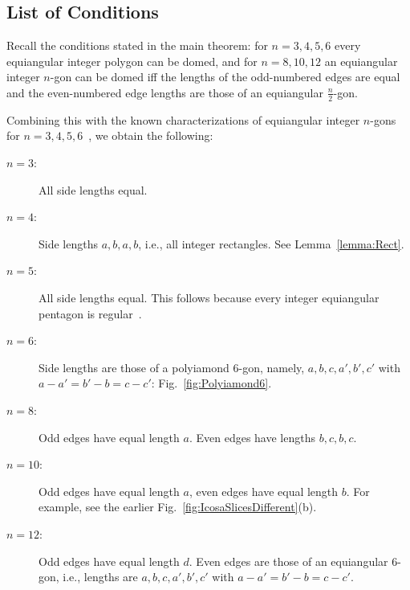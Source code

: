 \documentclass[11pt]{article}
\newcommand{\seclab}[1]{\label{sec:#1}}
\newcommand{\lemref}[1]{\ref{lemma:#1}}
\newcommand{\figref}[1]{\ref{fig:#1}}
\newcommand{\JOR}[1]{{\color{red} JOR: [#1]}}
\newcommand{\Anna}[1]{{\color{red} Anna: [#1]}}
\begin{document}
\subsection{List of Conditions}
\seclab{ListConditions}
%
Recall the conditions stated in the main theorem:
for $n=3,4,5,6$ every equiangular integer polygon can be domed, and for $n=8,10,12$ an equiangular integer $n$-gon can be domed iff the lengths of the odd-numbered edges are equal and the even-numbered edge lengths are those of an equiangular $\frac{n}{2}$-gon.

Combining this with the known  characterizations of equiangular integer $n$-gons for $n=3,4,5,6$~\cite{ball2002equiangular}, 
we obtain the following:
%
\begin{description}
\item[$n=3$:] All side lengths equal.
\item[$n=4$:] Side lengths $a,b,a,b$, i.e., all 
integer rectangles. See Lemma~\lemref{Rect}.
\item[$n=5$:] All side lengths equal. This follows because every  
integer equiangular pentagon is regular~\cite{ball2002equiangular}.
\item[$n=6$:] Side lengths are
those of a polyiamond $6$-gon, namely, $a,b,c,a',b',c'$ with $a-a' = b'-b = c-c'$:
Fig.~\figref{Polyiamond6}.
\item[$n=8$:] Odd edges have equal length $a$.
Even edges have lengths $b,c,b,c$. 
\item[$n=10$:] Odd edges have equal length $a$, even edges have equal length $b$. 
For example, see the earlier Fig.~\figref{IcosaSlicesDifferent}(b).
\item[$n=12$:] Odd edges have equal length $d$. 
%
Even edges are those of an equiangular $6$-gon, i.e., lengths are $a,b,c,a',b',c'$ with $a-a' = b'-b = c-c'$.
\end{description}
\end{document}
